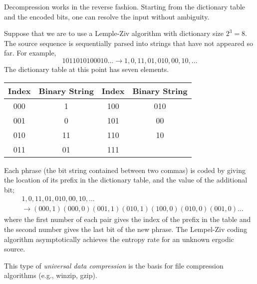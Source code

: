Decompression works in the reverse fashion.
Starting from the dictionary table and the encoded bits, one can resolve the input without ambiguity.

\begin{example}
Suppose that we are to use a Lemple-Ziv algorithm with dictionary size $2^3 = 8$.
The source sequence is sequentially parsed into strings that have not appeared so far.
For example, 
\begin{equation*}
1011010100010 \ldots \rightarrow 1, 0, 11, 01, 010, 00, 10, \ldots
\end{equation*}
The dictionary table at this point has seven elements.

\begin{center}
\begin{tabular}{|c|c|c|c|}
\hline
Index & Binary String & Index & Binary String \\
\hline
000 & 1 & 100 & 010 \\
001 & 0 & 101 & 00 \\
010 & 11 & 110 & 10 \\
011 & 01 & 111 & \\
\hline
\end{tabular}
\end{center}

Each phrase (the bit string contained between two commas) is coded by giving the location of its prefix in the dictionary table, and the value of the additional bit;
\begin{equation*}
\begin{split}
& 1, 0, 11, 01, 010, 00, 10, \ldots \\
& \rightarrow (000, 1)(000, 0)(001, 1)(010, 1)(100, 0)(010, 0)(001, 0) \ldots
\end{split}
\end{equation*}
where the first number of each pair gives the index of the prefix in the table and the second number gives the last bit of the new phrase. 
The Lempel-Ziv coding algorithm asymptotically achieves the entropy rate for an unknown ergodic source.
\end{example}

This type of \emph{universal data compression} is the basis for file compression algorithms (e.g., winzip, gzip).

